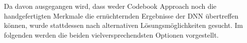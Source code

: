 
Da davon ausgegangen wird, dass weder Codebook Approach noch die handgefertigten Merkmale die ernüchternden Ergebnisse der DNN übertreffen können, wurde stattdessen nach alternativen Lösungsmöglichkeiten gesucht.
Im folgenden werden die beiden vielversprechendsten Optionen vorgestellt.










